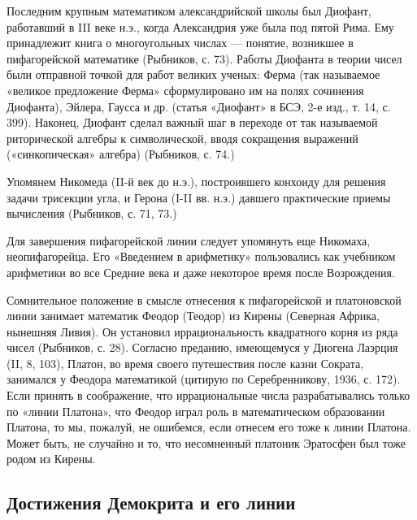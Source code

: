 Последним крупным математиком александрийской школы был Диофант,
работавший в III веке н.э., когда Александрия уже была под пятой
Рима. Ему принадлежит книга о многоугольных числах --- понятие,
возникшее в пифагорейской математике (Рыбников, с. 73). Работы
Диофанта в теории чисел были отправной точкой для работ великих
ученых: Ферма (так называемое «великое предложение Ферма»
сформулировано им на полях сочинения Диофанта), Эйлера, Гаусса и др.
(статья «Диофант» в БСЭ, 2-е изд., т. 14, с. 399). Наконец, Диофант
сделал важный шаг в переходе от так называемой риторической алгебры к
символической, вводя сокращения выражений («синкопическая» алгебра)
(Рыбников, с. 74.)

Упомянем Никомеда (II-й век до н.э.), построившего конхоиду для
решения задачи трисекции угла, и Герона (I-II вв. н.э.) давшего
практические приемы вычисления (Рыбников, с. 71, 73.)

Для завершения пифагорейской линии следует упомянуть еще Никомаха,
неопифагорейца. Его «Введением в арифметику» пользовались как
учебником арифметики во все Средние века и даже некоторое время после
Возрождения.

Сомнительное положение в смысле отнесения к пифагорейской и
платоновской линии занимает математик Феодор (Теодор) из Кирены
(Северная Африка, нынешняя Ливия). Он установил иррациональность
квадратного корня из ряда чисел (Рыбников, с. 28). Согласно преданию,
имеющемуся у Диогена Лаэрция (II, 8, 103), Платон, во время своего
путешествия после казни Сократа, занимался у Феодора математикой
(цитирую по Серебренникову, 1936, с. 172). Если принять в соображение,
что иррациональные числа разрабатывались только по «линии Платона»,
что Феодор играл роль в математическом образовании Платона, то мы,
пожалуй, не ошибемся, если отнесем его тоже к линии Платона. Может
быть, не случайно и то, что несомненный платоник Эратосфен был тоже
родом из Кирены.

\subsection{Достижения Демокрита и его линии}

